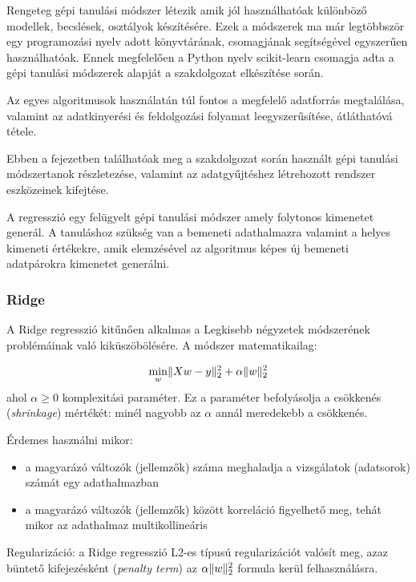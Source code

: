 
Rengeteg gépi tanulási módszer létezik amik jól használhatóak különböző modellek, becslések, osztályok készítésére. Ezek a módszerek ma már legtöbbször egy programozási nyelv adott könyvtárának, csomagjának segítségével egyszerűen használhatóak. Ennek megfelelően a Python nyelv scikit-learn \cite{scikitlearn} csomagja adta a gépi tanulási módszerek alapját a szakdolgozat elkészítése során.

Az egyes algoritmusok használatán túl fontos a megfelelő adatforrás megtalálása, valamint az adatkinyerési és feldolgozási folyamat leegyszerűsítése, átláthatóvá tétele. 

Ebben a fejezetben találhatóak meg a szakdolgozat során használt gépi tanulási módszertanok részletezése, valamint az adatgyűjtéshez létrehozott rendszer eszközeinek kifejtése.



 \label{subsec:regression}
A regresszió egy felügyelt gépi tanulási módszer amely folytonos kimenetet generál. A tanuláshoz szükség van a bemeneti adathalmazra valamint a helyes kimeneti értékekre, amik elemzésével az algoritmus képes új bemeneti adatpárokra kimenetet generálni.

\subsubsection{Ridge}
A Ridge regresszió \cite{sklearn-ridge}\cite{ml-ridge} kitűnően alkalmas a Legkisebb négyzetek módszerének problémáinak való kiküszöbölésére. 
A módszer matematikailag:

$$ \min_{w} \lVert Xw-y\rVert_2^2 + \alpha \lVert w\rVert_2^2$$ 
ahol $\alpha \geq 0$ komplexitási paraméter. Ez a paraméter befolyásolja a csökkenés (\textit{shrinkage}) mértékét: minél nagyobb az $\alpha$ annál meredekebb a csökkenés. 

Érdemes használni mikor:
\begin{itemize}
	\item a magyarázó változók (jellemzők) száma meghaladja a vizsgálatok (adatsorok) számát egy adathalmazban
	\item a magyarázó változók (jellemzők) között korreláció figyelhető meg, tehát mikor az adathalmaz multikollineáris
\end{itemize}

Regularizáció: a Ridge regresszió L2-es típusú regularizációt valósít meg, azaz büntető kifejezésként (\textit{penalty term}) az $\alpha \lVert w\rVert_2^2$ formula kerül felhasználásra.


